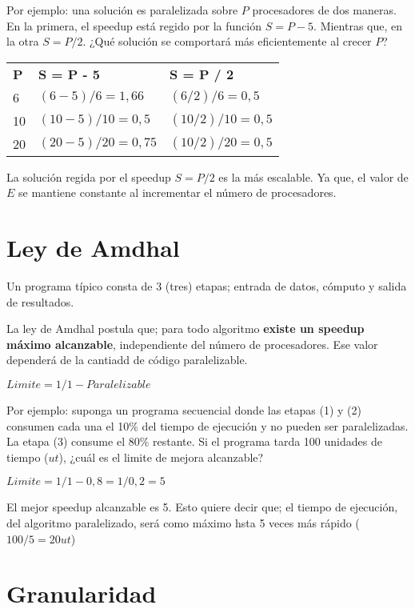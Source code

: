\documentclass[a4paper, 10pt]{report}
\begin{document}
Por ejemplo: una solución es paralelizada sobre $P$ procesadores de dos maneras. En la primera, el speedup está regido por la función $S = P-5$. Mientras que, en la otra $S = P/2$. ¿Qué solución se comportará más eficientemente al crecer $P$?

{\renewcommand{\arraystretch}{2}%
\begin{center}
\begin{tabular}{p{2cm} p{4cm} p{4cm}}
\textbf{P} &  \textbf{S = P - 5} & \textbf{S = P / 2} \\
6 & $(6-5)/6=1,66$ & $(6/2)/6=0,5$ \\
\hline
10 & $(10-5)/10=0,5$ & $(10/2)/10=0,5$ \\
\hline
20 & $(20-5)/20=0,75$ & $(10/2)/20=0,5$ \\
\end{tabular}
\end{center}}

La solución regida por el speedup $S = P/2$ es la más escalable. Ya que, el valor de $E$ se mantiene constante al incrementar el número de procesadores.

\section{Ley de Amdhal}

Un programa típico consta de 3 (tres) etapas; entrada de datos, cómputo y salida de resultados. 

La ley de Amdhal postula que; para todo algoritmo \textbf{existe un speedup máximo alcanzable}, independiente del número de procesadores. Ese valor dependerá de la cantiadd de código paralelizable.

\begin{center}
    $Limite = 1 / 1 - Paralelizable$
\end{center}

Por ejemplo: suponga un programa secuencial donde las etapas (1) y (2) consumen cada una el 10\% del tiempo de ejecución y no pueden ser paralelizadas. La etapa (3) consume el 80\% restante. Si el programa tarda 100 unidades de tiempo ($ut$), ¿cuál es el limite de mejora alcanzable?

\begin{center}
    $Limite = 1 / 1 - 0,8 = 1 / 0,2 = 5$
\end{center}

El mejor speedup alcanzable es 5. Esto quiere decir que; el tiempo de ejecución, del algoritmo paralelizado, será como máximo hsta 5 veces más rápido ($100/5 = 20 ut$)

\section{Granularidad}
\end{document}
